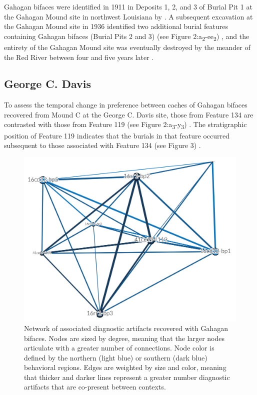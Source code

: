 \documentclass[]{interact}
\theoremstyle{plain}%
\theoremstyle{definition}
\theoremstyle{remark}
\begin{document}
Gahagan bifaces were identified in 1911 in Deposits 1, 2, and 3 of
Burial Pit 1 at the Gahagan Mound site in northwest Louisiana by
\citet[Figures 18-19, 21]{RN7115}. A subsequent excavation at the
Gahagan Mound site in 1936 identified two additional burial features
containing Gahagan bifaces (Burial Pits 2 and 3) (see Figure
2:a\textsubscript{2}-ee\textsubscript{2}) \citep[Plate 27]{RN8176}, and
the entirety of the Gahagan Mound site was eventually destroyed by the
meander of the Red River between four and five years later
\citep{RN10759}.

\hypertarget{george-c.-davis}{%
\subsection{George C. Davis}\label{george-c.-davis}}

To assess the temporal change in preference between caches of Gahagan
bifaces recovered from Mound C at the George C. Davis site, those from
Feature 134 are contrasted with those from Feature 119 (see Figure
2:a\textsubscript{3}-y\textsubscript{3}) \citep{RN5746, RN8186}. The
stratigraphic position of Feature 119 indicates that the burials in that
feature occurred subsequent to those associated with Feature 134 (see
Figure 3) \citep{RN5746, RN8186}.

\begin{figure}

{\centering \includegraphics[width=0.7\linewidth]{img/fig04} 

}

\caption{Network of associated diagnostic artifacts recovered with Gahagan bifaces. Nodes are sized by degree, meaning that the larger nodes articulate with a greater number of connections. Node color is defined by the northern (light blue) or southern (dark blue) behavioral regions. Edges are weighted by size and color, meaning that thicker and darker lines represent a greater number diagnostic artifacts that are co-present between contexts.}\label{fig:associated.net}
\end{figure}
\end{document}
